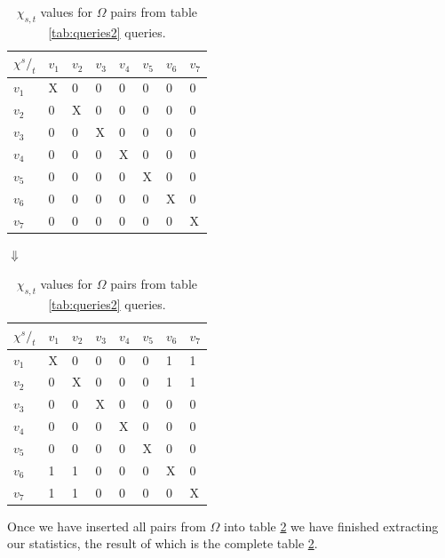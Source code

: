 \begin{table}
\center
\begin{tabular}{|l||l|l|l|l|l|l|l|}
\textbf{$\chi {^s/_t}$}	& $v_1$	& $v_2$	& $v_3$	& $v_4$	& $v_5$	& $v_6$	& $v_7$ \\\hline
$v_1$			& X	& 0	& 0	& 0	& 0	& 0	& 0	 \\
$v_2$			& 0	& X	& 0	& 0	& 0	& 0	& 0	 \\
$v_3$			& 0	& 0	& X	& 0	& 0	& 0	& 0	 \\
$v_4$			& 0	& 0	& 0	& X	& 0	& 0	& 0	 \\
$v_5$			& 0	& 0	& 0	& 0	& X	& 0	& 0	 \\
$v_6$			& 0	& 0	& 0	& 0	& 0	& X	& 0	 \\
$v_7$			& 0	& 0	& 0	& 0	& 0	& 0	& X	 \\\hline
\end{tabular}

\vspace{1em}
$\Downarrow$
\vspace{1em}

\begin{tabular}{|l||l|l|l|l|l|l|l|}
\textbf{$\chi {^s/_t}$}	& $v_1$	& $v_2$	& $v_3$	& $v_4$	& $v_5$	& $v_6$	& $v_7$ \\\hline
$v_1$			& X	& 0	& 0	& 0	& 0	& 1	& 1	 \\
$v_2$			& 0	& X	& 0	& 0	& 0	& 1	& 1	 \\
$v_3$			& 0	& 0	& X	& 0	& 0	& 0	& 0	 \\
$v_4$			& 0	& 0	& 0	& X	& 0	& 0	& 0	 \\
$v_5$			& 0	& 0	& 0	& 0	& X	& 0	& 0	 \\
$v_6$			& 1	& 1	& 0	& 0	& 0	& X	& 0	 \\
$v_7$			& 1	& 1	& 0	& 0	& 0	& 0	& X	 \\\hline
\end{tabular}
\caption{$\chi_{s,t}$ values for $\Omega$ pairs from table \ref{tab:queries2} queries.}
\label{tab:chiex}
\end{table}


Once we have inserted all pairs from $\Omega$ into table \ref{tab:chiex} we have finished extracting our statistics, the result of which is the complete table \ref{tab:chiex}.




